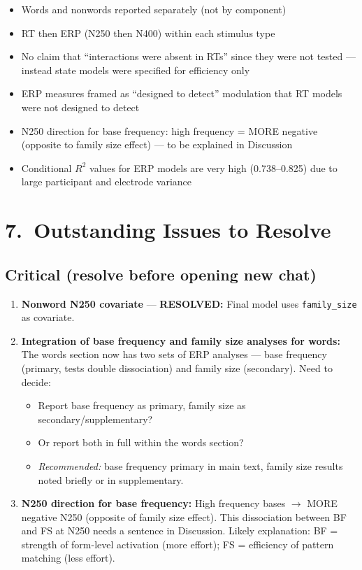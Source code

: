 \documentclass[11pt, a4paper]{article}
\begin{document}
\begin{itemize}[leftmargin=1.5em]
  \item Words and nonwords reported separately (not by component)
  \item RT then ERP (N250 then N400) within each stimulus type
  \item No claim that ``interactions were absent in RTs'' since they were not tested — instead state models were specified for efficiency only
  \item ERP measures framed as ``designed to detect'' modulation that RT models were not designed to detect
  \item N250 direction for base frequency: high frequency = MORE negative (opposite to family size effect) — to be explained in Discussion
  \item Conditional $R^2$ values for ERP models are very high (0.738--0.825) due to large participant and electrode variance
\end{itemize}

\section{7.\ Outstanding Issues to Resolve}

\subsection{Critical (resolve before opening new chat)}

\begin{enumerate}[leftmargin=1.5em]
  \item \textbf{Nonword N250 covariate} — \textbf{RESOLVED:} Final model uses \texttt{family\_size} as covariate.

  \item \textbf{Integration of base frequency and family size analyses for words:} The words section now has two sets of ERP analyses — base frequency (primary, tests double dissociation) and family size (secondary). Need to decide:
  \begin{itemize}
    \item Report base frequency as primary, family size as secondary/supplementary?
    \item Or report both in full within the words section?
    \item \textit{Recommended:} base frequency primary in main text, family size results noted briefly or in supplementary.
  \end{itemize}

  \item \textbf{N250 direction for base frequency:} High frequency bases $\to$ MORE negative N250 (opposite of family size effect). This dissociation between BF and FS at N250 needs a sentence in Discussion. Likely explanation: BF = strength of form-level activation (more effort); FS = efficiency of pattern matching (less effort).
\end{enumerate}
\end{document}
